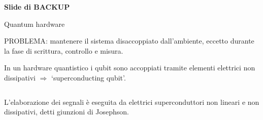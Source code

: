 \documentclass{beamer}
\renewcommand{\'}[0]{\`}
\newcommand{\backupbegin}{
   \newcounter{finalframe}
   \setcounter{finalframe}{\value{framenumber}}
}
\begin{document}
%
%
	
\appendix
\backupbegin

\begin{frame}

\centering \Huge \textbf{Slide di BACKUP}
\end{frame}

	\begin{frame}{Quantum hardware}		
	\vspace{-0.3cm}
	
	\alert{PROBLEMA}: mantenere il sistema disaccoppiato dall'ambiente, eccetto durante la fase di scrittura, controllo e misura.
	\vspace{0.5cm} 
	
	 In un hardware quantistico i qubit sono accoppiati tramite elementi elettrici \alert{non dissipativi} $\Longrightarrow$  `\alert{superconducting qubit}'.
		\vspace{0.5cm}
	
	\begin{columns}
	\hspace{0.35cm}
		
	
	 L'elaborazione dei segnali è eseguita da elettrici superconduttori \alert{non lineari} e \alert{non dissipativi}, detti giunzioni di Josephson.
	
	\hspace{-0.3cm}



	\end{columns}
	
		
 	\end{frame}
\end{document}
